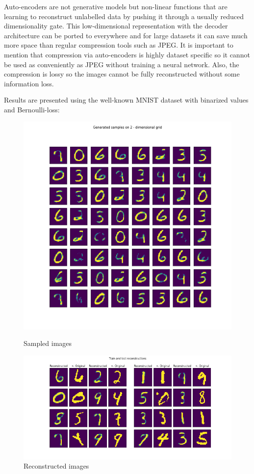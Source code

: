 \documentclass[12pt, english]{article}
\begin{document}
\par Auto-encoders are not generative models but non-linear functions that are learning to reconstruct unlabelled data by pushing it through a usually reduced dimensionality gate. This low-dimensional representation with the decoder architecture can be ported to everywhere and for large datasets it can save much more space than regular compression tools such as JPEG. It is important to mention that compression via auto-encoders is highly dataset specific so it cannot be used as conveniently as JPEG without training a neural network. Also, the compression is lossy so the images cannot be fully reconstructed without some information loss.

\vspace{4mm}

\par Results are presented using the well-known MNIST dataset with binarized values and Bernoulli-loss:

\vspace{4mm}

\begin{figure}[H] 
  \label{fig:auto_encoder_results} 
  \begin{minipage}{0.48\linewidth}
    \centering
    \includegraphics[width=.65\linewidth]{gen/generated_samples_mnist_auto_encoder.png} 
    \caption{Sampled images} 
  \end{minipage}\hfill
  \begin{minipage}{0.48\linewidth}
    \centering
    \includegraphics[width=.95\linewidth]{reco/reconstrunction_samples_mnist_auto_encoder.png} 
    \caption{Reconstructed images} 
  \end{minipage} 
\end{figure}
\end{document}
